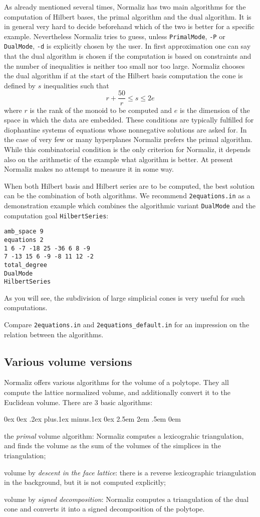 \documentclass[12pt,a4paper]{scrartcl}
\newcounter{listi}
\newcommand{\stdli}{ \topsep0ex \partopsep0ex %
\parsep.2ex plus.1ex minus.1ex \itemsep0ex%
\leftmargin2.5em \labelwidth2em \labelsep.5em \rightmargin0em}%
\newenvironment{arab}{\begin{list}{\textup{(\arabic{listi})}}%
	{\usecounter{listi}\stdli}}{\end{list}}
\theoremstyle{definition}
\begin{document}
As already mentioned several times, Normaliz has two main algorithms for the computation of Hilbert bases, the primal algorithm and the dual algorithm. It is in general very hard to decide beforehand which of the two is better for a specific example. Nevertheless Normaliz tries to guess, unless \verb|PrimalMode|, \verb|-P| or \verb|DualMode|, \verb|-d| is explicitly chosen by the user. In first approximation one can say that the dual algorithm is chosen if the computation is based on constraints and the number of inequalities is neither too small nor too large. Normaliz chooses the dual algorithm if at the start of the Hilbert basis computation the cone is defined by $s$ inequalities such that
$$
r+\frac{50}{r} \le s \le 2e
$$
where $r$ is the rank of the monoid to be computed and $e$ is the dimension of the space in which the data are embedded. These conditions are typically fulfilled for diophantine systems of equations whose nonnegative solutions are asked for.
In the case of very few or many hyperplanes Normaliz prefers the primal algorithm. While this combinatorial condition is the only criterion for Normaliz, it depends also on the arithmetic of the example what algorithm is better. At present Normaliz makes no attempt to measure it in some way.

When both Hilbert basis and Hilbert series are to be computed, the best solution can be the combination of both algorithms. We recommend \verb|2equations.in| as a demonstration example which combines the algorithmic variant \verb|DualMode| and the computation goal \verb|HilbertSeries|:
\begin{Verbatim}
amb_space 9
equations 2
1 6 -7 -18 25 -36 6 8 -9
7 -13 15 6 -9 -8 11 12 -2
total_degree
DualMode
HilbertSeries
\end{Verbatim}
As you will see, the subdivision of large simplicial cones is very useful for such computations.

Compare \verb|2equations.in| and \verb|2equations_default.in| for an impression on the relation between the algorithms.

\subsection{Various volume versions}\label{VariousVolumes}

Normaliz offers various algorithms for the volume of a polytope. They all compute the lattice normalized volume, and additionally convert it to the Euclidean volume. There are $3$ basic algorithms:
\begin{arab}
\item the \emph{primal} volume algorithm: Normaliz computes a lexicograhic triangulation, and finds the volume as the sum of the volumes of the simplices in the triangulation;
\item volume by \emph{descent in the face lattice}: there is a reverse lexicographic triangulation  in the background, but it is not computed explicitly;
\item volume by \emph{signed decomposition}: Normaliz computes a triangulation of the dual cone and converts it into a signed decomposition of the polytope.
\end{arab}
\end{document}
